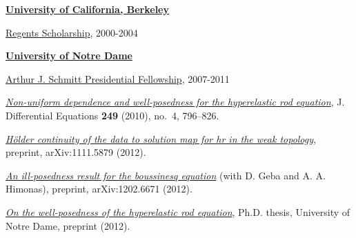 \documentclass[11pt,oneside]{amsart}
\renewcommand{\section}[2]%
{\vspace{0.7cm}%
\hspace{0in}%
\marginpar{\scshape #1}#2}
\begin{document}
\section{Awards} 
%
\href{http://berkeley.edu}
{\textbf{University of California, Berkeley }}
\begin{compactitem}
\item \href{http://students.berkeley.edu/finaid/undergraduates/
types_regents.htm}{Regents Scholarship}, 2000-2004
\end{compactitem}

\vspace{0.4cm}


\href{http://nd.edu}{\textbf{University of Notre Dame}}
\begin{compactitem}
\item \href{http://graduateschool.nd.edu/admissions/financial-support/prestigious-fellowships/presidential-fellowships-arthur-j-schmitt-fellowships}
{Arthur J. Schmitt Presidential Fellowship}, 2007-2011
\end{compactitem}


\section{Publications}
%
\vspace{-0.4cm}
\begin{compactenum}[1)]
\item \href{http://davidkarapetyan.com/pdfs/hr-nud-2010.pdf}{\emph{Non-uniform dependence and well-posedness for the
hyperelastic rod equation}}, J. Differential Equations \textbf{249} (2010),
  no.~4, 796--826.
\\
\item \href{http://arxiv.org/abs/1111.5879}{\emph{H{\"o}lder continuity of the data to solution map for hr in the
weak topology}}, preprint, arXiv:1111.5879 (2012).
\\
\item \href{http://arxiv.org/abs/1202.6671}{\emph{An
ill-posedness result for the boussinesq equation}} (with D. Geba and A. A. Himonas), preprint, arXiv:1202.6671
  (2012).
\\
\item \href{http://davidkarapetyan.com/pdfs/thesis.pdf}{\emph{On the well-posedness of the hyperelastic rod equation}}, Ph.D.
thesis, University of Notre Dame, preprint (2012).
\end{compactenum}

%
\end{document}
